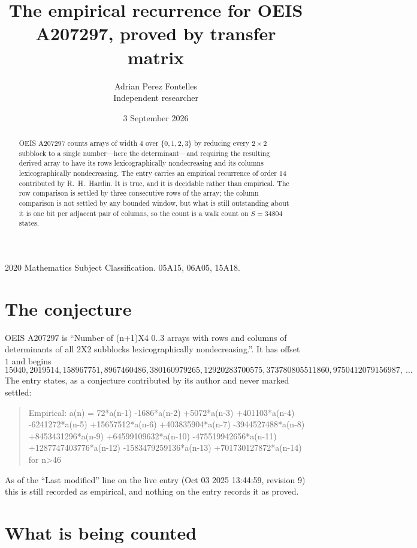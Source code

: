\documentclass[11pt,a4paper]{article}
\title{The empirical recurrence for OEIS A207297, proved by transfer matrix}
\author{Adrian Perez Fontelles\\ \small Independent researcher}
\date{3 September 2026}
\theoremstyle{plain}
\theoremstyle{definition}
\begin{document}
\maketitle

\begin{abstract}
OEIS A207297 counts arrays of width $4$ over $\{0,1,2,3\}$ by reducing every $2\times2$ subblock to a
single number---here the determinant---and requiring the resulting derived array to have its rows
lexicographically nondecreasing and its columns lexicographically nondecreasing. The entry carries an
empirical recurrence of order $14$ contributed by R.~H.~Hardin. It is true, and it is
decidable rather than empirical. The row comparison is settled by three consecutive rows of the
array; the column comparison is not settled by any bounded window, but what is still outstanding
about it is one bit per adjacent pair of columns, so the count is a walk count on $S=34804$
states.
\end{abstract}

\noindent\small 2020 Mathematics Subject Classification. 05A15, 06A05, 15A18.\normalsize

\section{The conjecture}

OEIS A207297 is ``Number of (n+1)X4 0..3 arrays with rows and columns of determinants of all 2X2 subblocks lexicographically nondecreasing.''. It has offset $1$ and begins
\[
15040, 2019514, 158967751, 8967460486, 380160979265, 12920283700575, 373780805511860, 9750412079156987,\ \dots
\]
The entry states, as a conjecture contributed by its author and never marked settled:
\begin{quote}
Empirical: a(n) = 72*a(n-1) -1686*a(n-2) +5072*a(n-3) +401103*a(n-4) -6241272*a(n-5) +15657512*a(n-6) +403835904*a(n-7) -3944527488*a(n-8) +8453431296*a(n-9) +64599109632*a(n-10) -475519942656*a(n-11) +1287747403776*a(n-12) -1583479259136*a(n-13) +701730127872*a(n-14) for n>46
\end{quote}
As of the ``Last modified'' line on the live entry (Oct 03 2025 13:44:59, revision 9) this is still
recorded as empirical, and nothing on the entry records it as proved.

\section{What is being counted}
\end{document}
